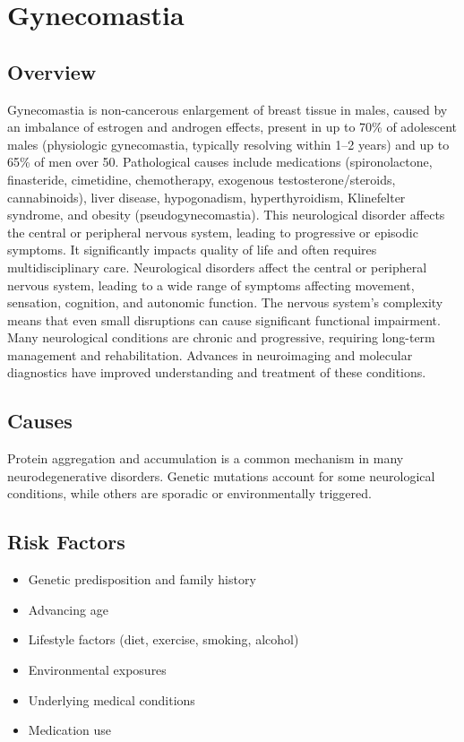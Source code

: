 \chapter{Gynecomastia}
\label{sec:Gynecomastia}

\section{Overview}
Gynecomastia is non-cancerous enlargement of breast tissue in males, caused by an imbalance of estrogen and androgen effects, present in up to 70\% of adolescent males (physiologic gynecomastia, typically resolving within 1--2 years) and up to 65\% of men over 50. Pathological causes include medications (spironolactone, finasteride, cimetidine, chemotherapy, exogenous testosterone/steroids, cannabinoids), liver disease, hypogonadism, hyperthyroidism, Klinefelter syndrome, and obesity (pseudogynecomastia). This neurological disorder affects the central or peripheral nervous system, leading to progressive or episodic symptoms. It significantly impacts quality of life and often requires multidisciplinary care. Neurological disorders affect the central or peripheral nervous system, leading to a wide range of symptoms affecting movement, sensation, cognition, and autonomic function. The nervous system's complexity means that even small disruptions can cause significant functional impairment. Many neurological conditions are chronic and progressive, requiring long-term management and rehabilitation. Advances in neuroimaging and molecular diagnostics have improved understanding and treatment of these conditions.
\section{Causes}
Protein aggregation and accumulation is a common mechanism in many neurodegenerative disorders.  Genetic mutations account for some neurological conditions, while others are sporadic or environmentally triggered.   
\section{Risk Factors}
\begin{itemize}[noitemsep]
  \item Genetic predisposition and family history
  \item Advancing age
  \item Lifestyle factors (diet, exercise, smoking, alcohol)
  \item Environmental exposures
  \item Underlying medical conditions
  \item Medication use
\end{itemize}
